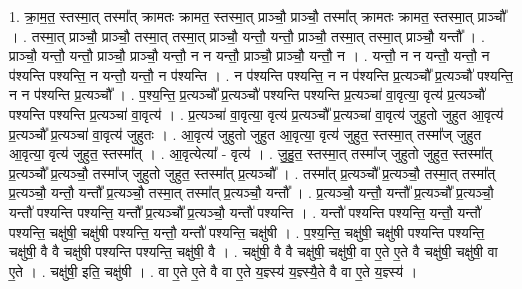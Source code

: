 \documentclass[17pt]{extarticle}
\begin{document}
1. क्रा॒म॒त॒ स्तस्मा॒त् तस्मा᳚त् क्रामतः क्रामत॒ स्तस्मा॒त् प्राञ्चौ॒ प्राञ्चौ॒ तस्मा᳚त् क्रामतः क्रामत॒ स्तस्मा॒त् प्राञ्चौ᳚ । . तस्मा॒त् प्राञ्चौ॒ प्राञ्चौ॒ तस्मा॒त् तस्मा॒त् प्राञ्चौ॒ यन्तौ॒ यन्तौ॒ प्राञ्चौ॒ तस्मा॒त् तस्मा॒त् प्राञ्चौ॒ यन्तौ᳚ । . प्राञ्चौ॒ यन्तौ॒ यन्तौ॒ प्राञ्चौ॒ प्राञ्चौ॒ यन्तौ॒ न न यन्तौ॒ प्राञ्चौ॒ प्राञ्चौ॒ यन्तौ॒ न । . यन्तौ॒ न न यन्तौ॒ यन्तौ॒ न प॑श्यन्ति पश्यन्ति॒ न यन्तौ॒ यन्तौ॒ न प॑श्यन्ति । . न प॑श्यन्ति पश्यन्ति॒ न न प॑श्यन्ति प्र॒त्यञ्चौ᳚ प्र॒त्यञ्चौ॑ पश्यन्ति॒ न न प॑श्यन्ति प्र॒त्यञ्चौ᳚ । . प॒श्य॒न्ति॒ प्र॒त्यञ्चौ᳚ प्र॒त्यञ्चौ॑ पश्यन्ति पश्यन्ति प्र॒त्यञ्चा॑ वा॒वृत्या॒ वृत्य॑ प्र॒त्यञ्चौ॑ पश्यन्ति पश्यन्ति प्र॒त्यञ्चा॑ वा॒वृत्य॑ । . प्र॒त्यञ्चा॑ वा॒वृत्या॒ वृत्य॑ प्र॒त्यञ्चौ᳚ प्र॒त्यञ्चा॑ वा॒वृत्य॑ जुहुतो जुहुत आ॒वृत्य॑ प्र॒त्यञ्चौ᳚ प्र॒त्यञ्चा॑ वा॒वृत्य॑ जुहुतः । . आ॒वृत्य॑ जुहुतो जुहुत आ॒वृत्या॒ वृत्य॑ जुहुत॒ स्तस्मा॒त् तस्मा᳚ज् जुहुत आ॒वृत्या॒ वृत्य॑ जुहुत॒ स्तस्मा᳚त् । . आ॒वृत्येत्या᳚ - वृत्य॑ । . जु॒हु॒त॒ स्तस्मा॒त् तस्मा᳚ज् जुहुतो जुहुत॒ स्तस्मा᳚त् प्र॒त्यञ्चौ᳚ प्र॒त्यञ्चौ॒ तस्मा᳚ज् जुहुतो जुहुत॒ स्तस्मा᳚त् प्र॒त्यञ्चौ᳚ । . तस्मा᳚त् प्र॒त्यञ्चौ᳚ प्र॒त्यञ्चौ॒ तस्मा॒त् तस्मा᳚त् प्र॒त्यञ्चौ॒ यन्तौ॒ यन्तौ᳚ प्र॒त्यञ्चौ॒ तस्मा॒त् तस्मा᳚त् प्र॒त्यञ्चौ॒ यन्तौ᳚ । . प्र॒त्यञ्चौ॒ यन्तौ॒ यन्तौ᳚ प्र॒त्यञ्चौ᳚ प्र॒त्यञ्चौ॒ यन्तौ॑ पश्यन्ति पश्यन्ति॒ यन्तौ᳚ प्र॒त्यञ्चौ᳚ प्र॒त्यञ्चौ॒ यन्तौ॑ पश्यन्ति । . यन्तौ॑ पश्यन्ति पश्यन्ति॒ यन्तौ॒ यन्तौ॑ पश्यन्ति॒ चक्षु॑षी॒ चक्षु॑षी पश्यन्ति॒ यन्तौ॒ यन्तौ॑ पश्यन्ति॒ चक्षु॑षी । . प॒श्य॒न्ति॒ चक्षु॑षी॒ चक्षु॑षी पश्यन्ति पश्यन्ति॒ चक्षु॑षी॒ वै वै चक्षु॑षी पश्यन्ति पश्यन्ति॒ चक्षु॑षी॒ वै । . चक्षु॑षी॒ वै वै चक्षु॑षी॒ चक्षु॑षी॒ वा ए॒ते ए॒ते वै चक्षु॑षी॒ चक्षु॑षी॒ वा ए॒ते । . चक्षु॑षी॒ इति॒ चक्षु॑षी । . वा ए॒ते ए॒ते वै वा ए॒ते य॒ज्ञ्स्य॑ य॒ज्ञ्स्यै॒ते वै वा ए॒ते य॒ज्ञ्स्य॑ । \newline
\end{document}
